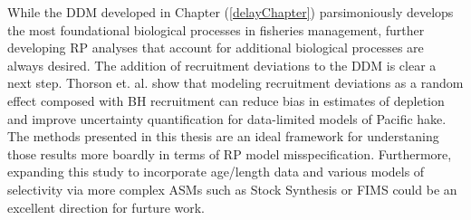\documentclass[12pt]{ucscthesis}
\begin{document}
%
While the DDM developed in Chapter (\ref{delayChapter}) parsimoniously develops 
the most foundational biological processes in fisheries management, further 
developing RP analyses that account for additional biological processes are 
always desired. The addition of recruitment deviations to the DDM is clear a next 
step. Thorson et. al. \cite{thorson_case_2019} show that modeling recruitment deviations
as a random effect composed with BH recruitment can reduce bias in estimates of depletion 
and improve uncertainty quantification for data-limited models of Pacific hake. %
The methods presented in this thesis are an ideal framework for understaning those 
results more boardly in terms of RP model misspecification. Furthermore, 
expanding this study to incorporate age/length data and various models of selectivity 
via more complex ASMs such as Stock Synthesis \cite{methot_stock_2013} or FIMS \cite{stawitz_fisheries_202}
could be an excellent direction for furture work.



\end{document}
